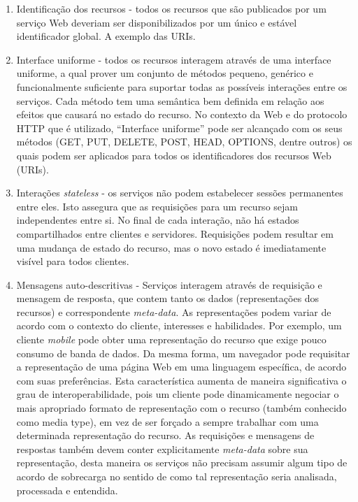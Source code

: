 \begin{enumerate}
\item Identificação dos recursos - todos os recursos que são publicados por um serviço Web deveriam ser disponibilizados por um único e estável identificador global\cite{Pautasso:2014}. A exemplo das URIs\cite{Franca:2011}.
\item Interface uniforme - todos os recursos interagem através de uma interface uniforme, a qual prover um conjunto de métodos pequeno, genérico e funcionalmente suficiente para suportar todas as possíveis interações entre os serviços. Cada método tem uma semântica bem definida em relação aos efeitos que causará no estado do recurso. No contexto da Web e do protocolo HTTP que é utilizado, ``Interface uniforme'' pode ser alcançado com os seus  métodos (GET, PUT, DELETE, POST, HEAD, OPTIONS, dentre outros) os quais podem ser aplicados para todos os identificadores dos recursos Web (URIs).\cite{Pautasso:2014}
\item Interações \textit{stateless} - os serviços não podem estabelecer sessões permanentes entre eles. Isto assegura que as requisições para um recurso sejam independentes entre si. No final de cada interação, não há estados compartilhados entre clientes e servidores. Requisições podem resultar em uma mudança de estado do recurso, mas o novo estado é imediatamente visível para todos clientes.\cite{Pautasso:2014}
\item Mensagens auto-descritivas - Serviços interagem através de requisição e mensagem de resposta, que contem tanto os dados (representações dos recursos) e correspondente \textit{meta-data}. As representações podem variar de acordo com o contexto do cliente, interesses e habilidades. Por exemplo, um cliente \textit{mobile} pode obter uma representação do recurso que exige pouco consumo de banda de dados. Da mesma forma, um navegador pode requisitar a representação de uma página Web em uma linguagem específica, de acordo com suas preferências. Esta característica aumenta de maneira significativa o grau de interoperabilidade, pois um cliente pode dinamicamente negociar o mais apropriado formato de representação com o recurso (também conhecido como media type), em vez de ser forçado a sempre trabalhar com uma determinada representação do recurso. As requisições e mensagens de respostas também devem conter explicitamente \textit{meta-data} sobre sua representação, desta maneira os serviços não precisam assumir algum tipo de acordo de sobrecarga no sentido de como tal representação seria analisada, processada e entendida.\cite{Pautasso:2014}

\end{enumerate}
